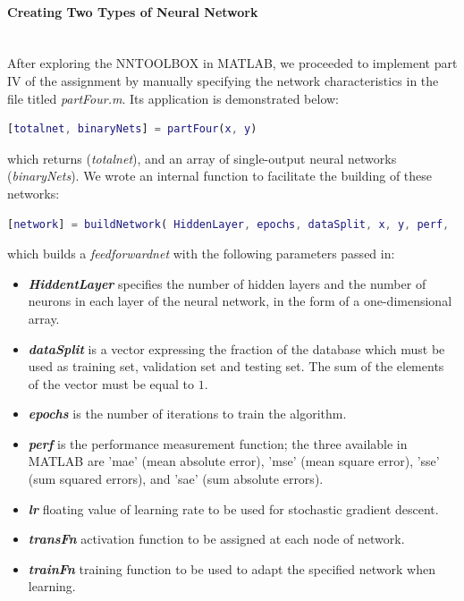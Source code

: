 \documentclass[a4paper,12pt,oneside,final]{report}
\newenvironment{changemargin}[2]{\begin{list}{}{%
\setlength{\topsep}{0pt}%
\setlength{\leftmargin}{0pt}%
\setlength{\rightmargin}{0pt}%
\setlength{\listparindent}{\parindent}%
\setlength{\itemindent}{\parindent}%
\setlength{\parsep}{0pt plus 1pt}%
\addtolength{\leftmargin}{#1}%
\addtolength{\rightmargin}{#2}%
}\item }{\end{list}}
\begin{document}
\paragraph{Creating Two Types of Neural Network} \hfill \\
After exploring the NNTOOLBOX in MATLAB, we proceeded to implement part IV of the assignment by manually specifying the network characteristics in the file titled \textit{partFour.m}.  Its application is demonstrated below:
\begin{changemargin}{-5mm}{-5mm}
\begin{lstlisting}[language=Matlab, frame=single]
[totalnet, binaryNets] = partFour(x, y)
\end{lstlisting}
\end{changemargin}
which returns  (\textit{totalnet}), and an array of single-output neural networks (\textit{binaryNets}). We wrote an internal function to facilitate the building of these networks:
\begin{changemargin}{-5mm}{-5mm}
\begin{lstlisting}[language=Matlab, frame=single]
[network] = buildNetwork( HiddenLayer, epochs, dataSplit, x, y, perf,  lr, transFn, trainFn)
\end{lstlisting}
\end{changemargin}
which builds a \textit{feedforwardnet} with the following parameters passed in:
\begin{itemize}
\item {\bf \textit{HiddentLayer} } specifies the number of hidden layers and the number of neurons in each layer of the neural network, in the form of a one-dimensional array.
\item {\bf \textit{dataSplit} } is a vector expressing the fraction of the database which must be used as training set, validation set and testing set. The sum of the elements of the vector must be equal to $1$.
\item {\bf \textit{epochs} } is the number of iterations to train the algorithm.
\item {\bf \textit{perf} } is the performance measurement function; the three available in MATLAB are 'mae' (mean absolute error), 'mse' (mean square error), 'sse' (sum squared errors), and 'sae' (sum absolute errors).
\item {\bf \textit{lr} } floating value of learning rate to be used for stochastic gradient descent.
\item {\bf \textit{transFn}} activation function to be assigned at each node of network.
\item {\bf \textit{trainFn}} training function to be used to adapt the specified network when learning.
\end{itemize}
\end{document}

